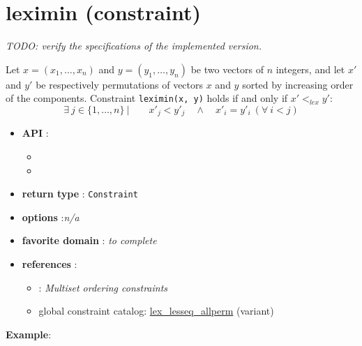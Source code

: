 \label{leximin}
\hypertarget{leximin}{}

\section{leximin (constraint)}\label{leximin:leximinconstraint}\hypertarget{leximin:leximinconstraint}{}

\emph{TODO: verify the specifications of the implemented version.}

\begin{notedef}
Let $x = (x_1,\ldots, x_n)$ and $y = (y_1,\ldots, y_n)$ be two vectors of $n$ integers, and let $x'$ and $y'$ be respectively permutations of vectors $x$ and $y$ sorted by increasing order of the components.
Constraint \texttt{leximin(x, y)} holds if and only if $x'<_{lex} y'$:
$$\exists\ j\in\{1,\ldots,n\}\ |\qquad x'_j<y'_j\quad \land\quad x'_i=y'_i\ (\forall\  i<j)$$
  \end{notedef}

\begin{itemize}
	\item \textbf{API} :
	\begin{itemize}
		\item {}
		\item {}
	\end{itemize}
	\item \textbf{return type} : \texttt{Constraint}
	\item \textbf{options} :\emph{n/a}
	\item \textbf{favorite domain} : \emph{to complete}
	\item \textbf{references} :
      \begin{itemize}
      \item \cite{FrischIJCAI03}: \emph{Multiset ordering constraints} 
      \item global constraint catalog: \href{http://www.emn.fr/x-info/sdemasse/gccat/Clex_lesseq_allperm.html}{lex\_lesseq\_allperm} (variant)
      \end{itemize}
\end{itemize}

\textbf{Example}:

